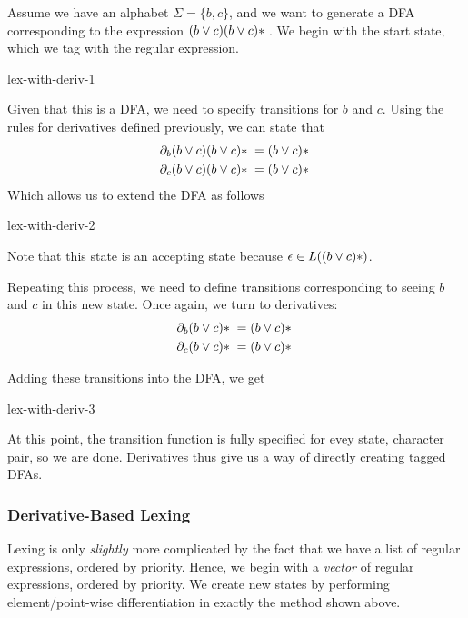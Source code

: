 Assume we have an alphabet $\Sigma = \{ b, c\}$, and we want to generate a DFA corresponding to the expression $(b \lor c)(b\lor c)\*$. We begin with the start state, which we tag with the regular expression. 

\begin{center}
    {lex-with-deriv-1}
\end{center}

Given that this is a DFA, we need to specify transitions for $b$ and $c$. Using the rules for derivatives defined previously, we can state that 
\begin{align*}
    \partial_b (b \lor c)(b \lor c)\* = (b \lor c)\*\\
    \partial_c (b \lor c)(b \lor c)\* = (b \lor c)\*
\end{align*}
Which allows us to extend the DFA as follows

\begin{center}
    {lex-with-deriv-2}
\end{center}
Note that this state is an accepting state because $\epsilon \in L((b \lor c)\*)$. 

Repeating this process, we need to define transitions corresponding to seeing $b$ and $c$ in this new state. Once again, we turn to derivatives:
\begin{align*}
    \partial_b (b \lor c)\* = (b \lor c)\*\\
    \partial_c (b \lor c)\* = (b \lor c)\*
\end{align*}

Adding these transitions into the DFA, we get

\begin{center}
    {lex-with-deriv-3}
\end{center}

At this point, the transition function is fully specified for evey state, character pair, so we are done. Derivatives thus give us a way of directly creating tagged DFAs.

\subsubsection{Derivative-Based Lexing}
Lexing is only \emph{slightly} more complicated by the fact that we have a list of regular expressions, ordered by priority. Hence, we begin with a \emph{vector} of regular expressions, ordered by priority. We create new states by performing element/point-wise differentiation in exactly the method shown above. 

